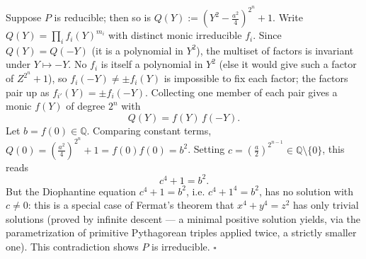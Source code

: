 \documentclass{article}
\newcommand{\Q}{\mathbb{Q}}
\begin{document}
Suppose \( P \) is reducible; then so is \( Q(Y) := \left(Y^2 - \tfrac{a^2}{4}\right)^{2^n} + 1 \). Write \( Q(Y) = \prod_i f_i(Y)^{m_i} \) with distinct monic irreducible \( f_i \). Since \( Q(Y) = Q(-Y) \) (it is a polynomial in \( Y^2 \)), the multiset of factors is invariant under \( Y \mapsto -Y \). No \( f_i \) is itself a polynomial in \( Y^2 \) (else it would give such a factor of \( Z^{2^n}+1 \)), so \( f_i(-Y) \neq \pm f_i(Y) \) is impossible to fix each factor; the factors pair up as \( f_{i'}(Y) = \pm f_i(-Y) \). Collecting one member of each pair gives a monic \( f(Y) \) of degree \( 2^n \) with
\[
Q(Y) = f(Y)\, f(-Y).
\]
Let \( b = f(0) \in \Q \). Comparing constant terms, \( Q(0) = \left(\tfrac{a^2}{4}\right)^{2^n} + 1 = f(0)f(0) = b^2 \). Setting \( c = \left(\tfrac{a}{2}\right)^{2^{n-1}} \in \Q \setminus \{0\} \), this reads
\[
c^4 + 1 = b^2.
\]
But the Diophantine equation \( c^4 + 1 = b^2 \), i.e. \( c^4 + 1^4 = b^2 \), has no solution with \( c \neq 0 \): this is a special case of Fermat's theorem that \( x^4 + y^4 = z^2 \) has only trivial solutions (proved by infinite descent --- a minimal positive solution yields, via the parametrization of primitive Pythagorean triples applied twice, a strictly smaller one). This contradiction shows \( P \) is irreducible. \hfill\(\square\)
\end{document}
